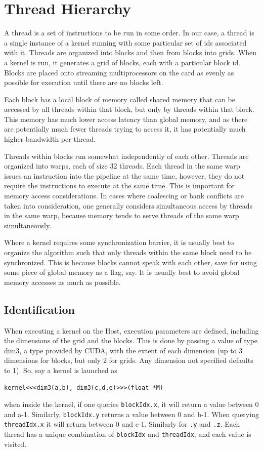 \documentclass[a4paper,12pt]{report}
\begin{document}
\section{Thread Hierarchy}
A thread is a set of instructions to be run in some order\cite[p~7]{ CUDA_C_Programming_Guide}.
In our case, a thread is a single instance of a kernel running with some particular set of ids associated with it.
Threads are organized into blocks and then from blocks into grids.
When a kernel is run, it generates a grid of blocks, each with a particular block id.
Blocks are placed onto streaming multiprocessors on the card as evenly as possible for execution until there are no blocks left.

Each block has a local block of memory called shared memory that can be accessed by all threads within that block, but only by threads within that block.
This memory has much lower access latency than global memory, and as there are potentially much fewer threads trying to access it, it has potentially much higher bandwidth per thread.

Threads within blocks run somewhat independently of each other.
Threads are organized into warps, each of size 32 threads.
Each thread in the same warp issues an instruction into the pipeline at the same time, however, they do not require the instructions to execute at the same time.
This is important for memory access considerations.
In cases where coalescing or bank conflicts are taken into consideration, one generally considers simultaneous access by threads in the same warp, because memory tends to serve threads of the same warp simultaneously.

Where a kernel requires some synchronization barrier, it is usually best to organize the algorithm such that only threads within the same block need to be synchronized.
This is because blocks cannot speak with each other, save for using some piece of global memory as a flag, say.
It is usually best to avoid global memory accesses as much as possible.

\subsection{Identification}
When executing a kernel on the Host, execution parameters are defined, including the dimensions of the grid and the blocks\cite[p~9]{ CUDA_C_Programming_Guide}.
This is done by passing a value of type dim3, a type provided by CUDA, with the extent of each dimension (up to 3 dimensions for blocks, but only 2 for grids.
Any dimension not specified defaults to 1).
So, say a kernel is launched as
%
\begin{verbatim}
kernel<<<dim3(a,b), dim3(c,d,e)>>>(float *M)
\end{verbatim}
%
when inside the kernel, if one queries \verb!blockIdx.x!, it will return a value between 0 and a-1.
Similarly, \verb!blockIdx.y! returns a value between 0 and b-1.
When querying \verb!threadIdx.x! it will return between 0 and c-1.
Similarly for \verb!.y! and \verb!.z!. Each thread has a unique combination of \verb!blockIdx! and \verb!threadIdx!, and each value is visited.
\end{document}
